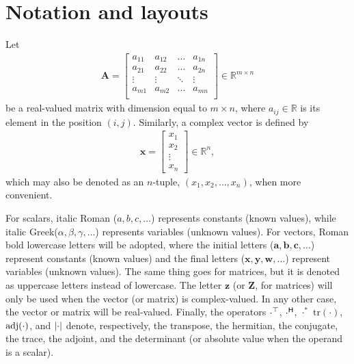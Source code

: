 \section{Notation and layouts}
\label{sec:notation}

Let
\begin{align}
    \mathbf{A} = \begin{bmatrix}
        a_{11} & a_{12} & \dots & a_{1n} \\
        a_{21} & a_{22} & \dots & a_{2n} \\
        \vdots & \vdots & \ddots & \vdots \\
        a_{m1} & a_{m2} & \dots & a_{mn} \\
    \end{bmatrix} \in \mathbb{R}^{m \times n}
\end{align}
be a real-valued matrix with dimension equal to \(m \times n\), where \(a_{ij} \in \mathbb{R}\) is its element in the position \((i,j)\). Similarly, a complex vector is defined by
\begin{align}
    \mathbf{x} = \begin{bmatrix}
        x_1 \\
        x_2 \\
        \vdots \\
        x_n
    \end{bmatrix}  \in \mathbb{R}^{n},
\end{align}
which may also be denoted as an \(n\)-tuple, \((x_1, x_2, \dots, x_n)\), when more convenient.

For scalars, italic Roman (\(a,b,c,\dots\)) represents constants (known values), while italic Greek\linebreak (\(\alpha, \beta, \gamma, \dots\)) represents variables (unknown values). For vectors, Roman bold lowercase letters will be adopted, where the initial letters (\(\mathbf{a}, \mathbf{b}, \mathbf{c}, \dots\)) represent constants (known values) and the final letters (\(\mathbf{x}, \mathbf{y}, \mathbf{w}, \dots\)) represent variables (unknown values). The same thing goes for matrices, but it is denoted as uppercase letters instead of lowercase. The letter \(\mathbf{z}\) (or \(\mathbf{Z}\), for matrices) will only be used when the vector (or matrix) is complex-valued. In any other case, the vector or matrix will be real-valued. Finally, the operators \(\cdot^{\top}\), \(\cdot^{\mathsf{H}}\), \(\cdot^*\) \(\text{tr}(\cdot)\), \(\textnormal{adj}(\cdot)\), and \(\abs{\cdot}\) denote, respectively, the transpose, the hermitian, the conjugate, the trace, the adjoint, and the determinant (or absolute value when the operand is a scalar).

